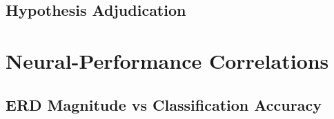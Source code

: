 %
%
%
%
%
%
%


\subsection{Hypothesis Adjudication}
\label{subsec:results_adjudication}

%
%
%
%


\section{Neural-Performance Correlations}
\label{sec:results_correlations}



\subsection{ERD Magnitude vs Classification Accuracy}
\label{subsec:results_erd_accuracy}

%
%
%
%


